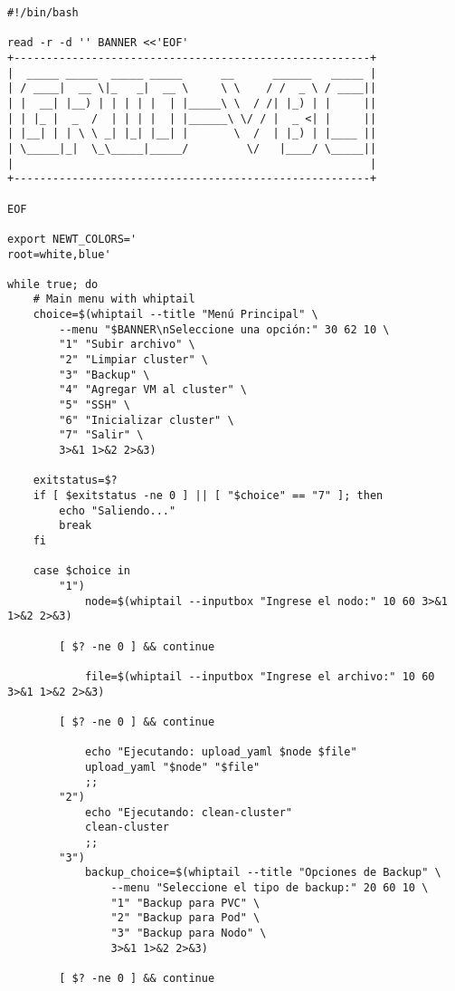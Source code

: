 \begin{verbatim}
#!/bin/bash

read -r -d '' BANNER <<'EOF'
+-------------------------------------------------------+
|  _____ _____  _____ _____      __      ______   _____ |
| / ____|  __ \|_   _|  __ \     \ \    / /  _ \ / ____||
| |  __| |__) | | | | |  | |_____\ \  / /| |_) | |     ||
| | |_ |  _  /  | | | |  | |______\ \/ / |  _ <| |     ||
| |__| | | \ \ _| |_| |__| |       \  /  | |_) | |____ ||
| \_____|_|  \_\_____|_____/         \/   |____/ \_____||
|                                                       |
+-------------------------------------------------------+

EOF

export NEWT_COLORS='
root=white,blue'

while true; do
    # Main menu with whiptail
    choice=$(whiptail --title "Menú Principal" \
        --menu "$BANNER\nSeleccione una opción:" 30 62 10 \
        "1" "Subir archivo" \
        "2" "Limpiar cluster" \
        "3" "Backup" \
        "4" "Agregar VM al cluster" \
        "5" "SSH" \
        "6" "Inicializar cluster" \
        "7" "Salir" \
        3>&1 1>&2 2>&3)

    exitstatus=$?
    if [ $exitstatus -ne 0 ] || [ "$choice" == "7" ]; then
        echo "Saliendo..."
        break
    fi

    case $choice in
        "1")
            node=$(whiptail --inputbox "Ingrese el nodo:" 10 60 3>&1 1>&2 2>&3)

	    [ $? -ne 0 ] && continue

            file=$(whiptail --inputbox "Ingrese el archivo:" 10 60 3>&1 1>&2 2>&3)

	    [ $? -ne 0 ] && continue

            echo "Ejecutando: upload_yaml $node $file"
            upload_yaml "$node" "$file"
            ;;
        "2")
            echo "Ejecutando: clean-cluster"
            clean-cluster
            ;;
        "3")
            backup_choice=$(whiptail --title "Opciones de Backup" \
                --menu "Seleccione el tipo de backup:" 20 60 10 \
                "1" "Backup para PVC" \
                "2" "Backup para Pod" \
                "3" "Backup para Nodo" \
                3>&1 1>&2 2>&3)

	    [ $? -ne 0 ] && continue


\end{verbatim}
